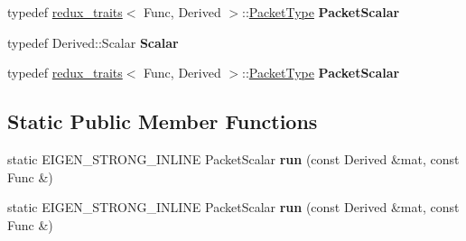 \begin{DoxyCompactItemize}
\item 
\mbox{\label{struct_eigen_1_1internal_1_1redux__vec__unroller_3_01_func_00_01_derived_00_01_start_00_011_01_4_a91cc369ce48eb032480ff90f6f6ac4fb}} 
typedef \hyperlink{struct_eigen_1_1internal_1_1redux__traits}{redux\+\_\+traits}$<$ Func, Derived $>$\+::\hyperlink{struct_eigen_1_1_packet_type}{Packet\+Type} {\bfseries Packet\+Scalar}
\item 
\mbox{\label{struct_eigen_1_1internal_1_1redux__vec__unroller_3_01_func_00_01_derived_00_01_start_00_011_01_4_a15445c6523f3bd3d1e58de8d39f2561e}} 
typedef Derived\+::\+Scalar {\bfseries Scalar}
\item 
\mbox{\label{struct_eigen_1_1internal_1_1redux__vec__unroller_3_01_func_00_01_derived_00_01_start_00_011_01_4_a91cc369ce48eb032480ff90f6f6ac4fb}} 
typedef \hyperlink{struct_eigen_1_1internal_1_1redux__traits}{redux\+\_\+traits}$<$ Func, Derived $>$\+::\hyperlink{struct_eigen_1_1_packet_type}{Packet\+Type} {\bfseries Packet\+Scalar}
\end{DoxyCompactItemize}
\subsection*{Static Public Member Functions}
\begin{DoxyCompactItemize}
\item 
\mbox{\label{struct_eigen_1_1internal_1_1redux__vec__unroller_3_01_func_00_01_derived_00_01_start_00_011_01_4_a6f0e35f6097c11798930ccb12c109a98}} 
static E\+I\+G\+E\+N\+\_\+\+S\+T\+R\+O\+N\+G\+\_\+\+I\+N\+L\+I\+NE Packet\+Scalar {\bfseries run} (const Derived \&mat, const Func \&)
\item 
\mbox{\label{struct_eigen_1_1internal_1_1redux__vec__unroller_3_01_func_00_01_derived_00_01_start_00_011_01_4_a6f0e35f6097c11798930ccb12c109a98}} 
static E\+I\+G\+E\+N\+\_\+\+S\+T\+R\+O\+N\+G\+\_\+\+I\+N\+L\+I\+NE Packet\+Scalar {\bfseries run} (const Derived \&mat, const Func \&)
\end{DoxyCompactItemize}


